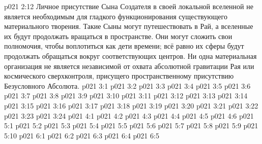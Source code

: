\vs p021 2:12 Личное присутствие Сына Создателя в своей локальной вселенной не является необходимым для гладкого функционирования существующего материального творения. Такие Сыны могут путешествовать в Рай, а вселенные их будут продолжать вращаться в пространстве. Они могут сложить свои полномочия, чтобы воплотиться как дети времени; всё равно их сферы будут продолжать обращаться вокруг соответствующих центров. Ни одна материальная организация не является независимой от охвата абсолютной гравитации Рая или космического сверхконтроля, присущего пространственному присутствию Безусловного Абсолюта.
\vs p021 3:1 
\vs p021 3:2 \pc 
\vs p021 3:3 
\vs p021 3:4 \pc 
\vs p021 3:5 
\vs p021 3:6 
\vs p021 3:7 
\vs p021 3:8 
\vs p021 3:9 
\vs p021 3:10 
\vs p021 3:11 
\vs p021 3:12 \pc 
\vs p021 3:13 
\vs p021 3:14 
\vs p021 3:15 
\vs p021 3:16 \pc 
\vs p021 3:17 
\vs p021 3:18 
\vs p021 3:19 
\vs p021 3:20 
\vs p021 3:21 
\vs p021 3:22 
\vs p021 3:23 
\vs p021 3:24 \pc 
{}
\vs p021 4:1 
\vs p021 4:2 
\vs p021 4:3 
\vs p021 4:4 
\vs p021 4:5 \pc 
\vs p021 4:6 \pc 
{}
\vs p021 5:1 
\vs p021 5:2 
\vs p021 5:3 
\vs p021 5:4 
\vs p021 5:5 \pc 
\vs p021 5:6 \pc 
\vs p021 5:7 
\vs p021 5:8 \pc 
\vs p021 5:9 
\vs p021 5:10 
\vs p021 6:1 
\vs p021 6:2 
\vs p021 6:3 
\vs p021 6:4 
\vsetoff
\vs p021 6:5 
\quizlink
